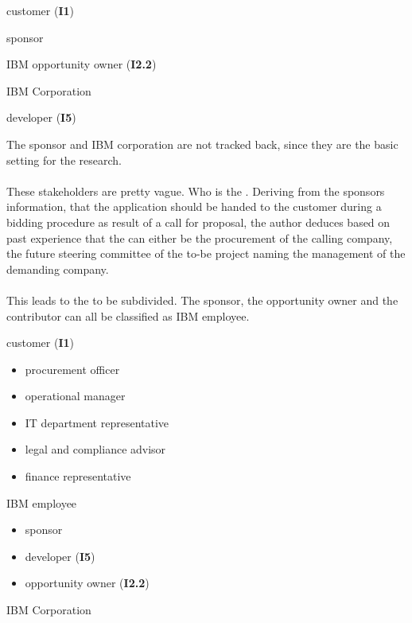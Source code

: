 \begin{closeItemCol}
    \item customer (\textbf{I1})
    \item sponsor
    \item IBM opportunity owner (\textbf{I2.2})
    \item IBM Corporation
    \item developer (\textbf{I5})
\end{closeItemCol}

The sponsor and IBM corporation are not tracked back, since they are the basic setting for the research.

\paragraph{} These stakeholders are pretty vague. Who is the . Deriving from the sponsors information, that the application should be handed to the customer during a bidding procedure as result of a call for proposal, the author deduces based on past experience that the  can either be the procurement of the calling company, the future steering committee of the to-be project naming the management of the demanding company. 

\paragraph{} This leads to the  to be subdivided. The sponsor, the opportunity owner and the contributor can all be classified as IBM employee.

\begin{closeItemCol}
    \item customer (\textbf{I1})
    \begin{itemize}
        \item procurement officer
        \item operational manager
        \item IT department representative
        \item legal and compliance advisor
        \item finance representative
    \end{itemize} \columnbreak
    
    \item IBM employee 
    \begin{itemize}
        \item sponsor
        \item developer (\textbf{I5})
        \item opportunity owner (\textbf{I2.2})
    \end{itemize}
    \item IBM Corporation
\end{closeItemCol}

